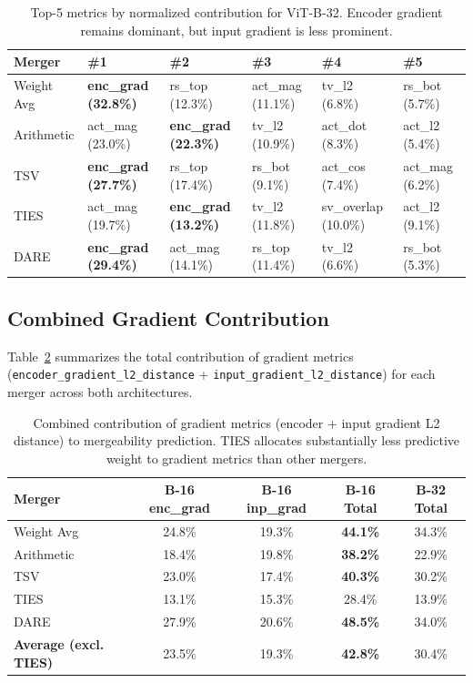 \begin{table}[h]
\centering
\caption{Top-5 metrics by normalized contribution for ViT-B-32. Encoder gradient remains dominant, but input gradient is less prominent.}
\label{tab:norm_contrib_b32}
\small
\begin{tabular}{llllll}
\toprule
\textbf{Merger} & \textbf{\#1} & \textbf{\#2} & \textbf{\#3} & \textbf{\#4} & \textbf{\#5} \\
\midrule
Weight Avg & \textbf{enc\_grad (32.8\%)} & rs\_top (12.3\%) & act\_mag (11.1\%) & tv\_l2 (6.8\%) & rs\_bot (5.7\%) \\
Arithmetic & act\_mag (23.0\%) & \textbf{enc\_grad (22.3\%)} & tv\_l2 (10.9\%) & act\_dot (8.3\%) & act\_l2 (5.4\%) \\
TSV & \textbf{enc\_grad (27.7\%)} & rs\_top (17.4\%) & rs\_bot (9.1\%) & act\_cos (7.4\%) & act\_mag (6.2\%) \\
TIES & act\_mag (19.7\%) & \textbf{enc\_grad (13.2\%)} & tv\_l2 (11.8\%) & sv\_overlap (10.0\%) & act\_l2 (9.1\%) \\
DARE & \textbf{enc\_grad (29.4\%)} & act\_mag (14.1\%) & rs\_top (11.4\%) & tv\_l2 (6.6\%) & rs\_bot (5.3\%) \\
\bottomrule
\end{tabular}
\end{table}

\subsection{Combined Gradient Contribution}

Table~\ref{tab:gradient_contribution} summarizes the total contribution of gradient metrics (\texttt{encoder\_gradient\_l2\_distance} + \texttt{input\_gradient\_l2\_distance}) for each merger across both architectures.

\begin{table}[h]
\centering
\caption{Combined contribution of gradient metrics (encoder + input gradient L2 distance) to mergeability prediction. TIES allocates substantially less predictive weight to gradient metrics than other mergers.}
\label{tab:gradient_contribution}
\begin{tabular}{lcccc}
\toprule
\textbf{Merger} & \textbf{B-16 enc\_grad} & \textbf{B-16 inp\_grad} & \textbf{B-16 Total} & \textbf{B-32 Total} \\
\midrule
Weight Avg & 24.8\% & 19.3\% & \textbf{44.1\%} & 34.3\% \\
Arithmetic & 18.4\% & 19.8\% & \textbf{38.2\%} & 22.9\% \\
TSV & 23.0\% & 17.4\% & \textbf{40.3\%} & 30.2\% \\
TIES & 13.1\% & 15.3\% & 28.4\% & 13.9\% \\
DARE & 27.9\% & 20.6\% & \textbf{48.5\%} & 34.0\% \\
\midrule
\textbf{Average (excl. TIES)} & 23.5\% & 19.3\% & \textbf{42.8\%} & 30.4\% \\
\bottomrule
\end{tabular}
\end{table}

